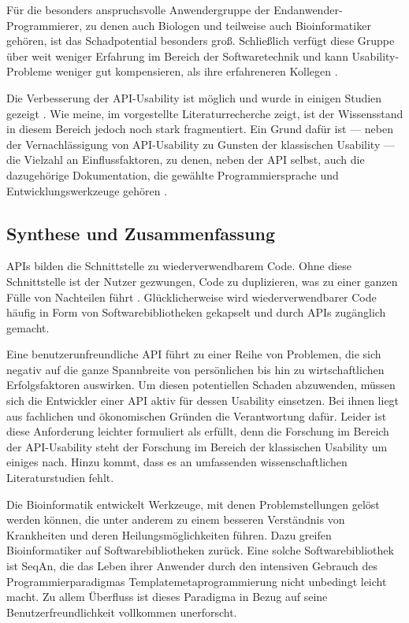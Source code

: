 Für die besonders anspruchsvolle Anwendergruppe der Endanwender-Programmierer, zu denen auch Biologen \citep{Tisdall:2001td} und teilweise auch Bioinformatiker \citep{Letondal:2006dy} gehören, ist das Schadpotential besonders groß. Schließlich verfügt diese Gruppe über weit weniger Erfahrung im Bereich der Softwaretechnik und kann Usability-Probleme weniger gut kompensieren, als ihre erfahreneren Kollegen \citep{Shaft:1998tc}.

Die Verbesserung der API-Usability ist möglich und wurde in einigen Studien gezeigt \citep{Letondal:2006dy,Grill:2012jm,Tenny:2011jp,Piccioni:2013uq}. Wie meine, im  vorgestellte Literaturrecherche zeigt, ist der Wissensstand in diesem Bereich jedoch noch stark fragmentiert. Ein Grund dafür ist --- neben der Vernachlässigung von API-Usability zu Gunsten der klassischen Usability --- die Vielzahl an Einflussfaktoren, zu denen, neben der API selbst, auch die dazugehörige Dokumentation, die gewählte Programmiersprache und Entwicklungswerkzeuge gehören \citep{Stylos:2008jt}.

\subsection{Synthese und Zusammenfassung}

APIs bilden die Schnittstelle zu wiederverwendbarem Code. Ohne diese Schnittstelle ist der Nutzer gezwungen, Code zu duplizieren, was zu einer ganzen Fülle von Nachteilen führt \citep{Spinellis:2006tj}. Glücklicherweise wird wiederverwendbarer Code häufig in Form von Softwarebibliotheken gekapselt und durch APIs zugänglich gemacht.

Eine benutzerunfreundliche API führt zu einer Reihe von Problemen, die sich negativ auf die ganze Spannbreite von persönlichen bis hin zu wirtschaftlichen Erfolgsfaktoren auswirken. Um diesen potentiellen Schaden abzuwenden, müssen sich die Entwickler einer API aktiv für dessen Usability einsetzen. Bei ihnen liegt aus fachlichen und ökonomischen Gründen die Verantwortung dafür. Leider ist diese Anforderung leichter formuliert als erfüllt, denn die Forschung im Bereich der API-Usability steht der Forschung im Bereich der klassischen Usability um einiges nach. Hinzu kommt, dass es an umfassenden wissenschaftlichen Literaturstudien fehlt.

Die Bioinformatik entwickelt Werkzeuge, mit denen Problemstellungen gelöst werden können, die unter anderem zu einem besseren Verständnis von Krankheiten und deren Heilungsmöglichkeiten führen. Dazu greifen Bioinformatiker auf Softwarebibliotheken zurück. Eine solche Softwarebibliothek ist SeqAn, die das Leben ihrer Anwender durch den intensiven Gebrauch des Programmierparadigmas Templatemetaprogrammierung nicht unbedingt leicht macht. Zu allem Überfluss ist dieses Paradigma in Bezug auf seine Benutzerfreundlichkeit vollkommen unerforscht.

